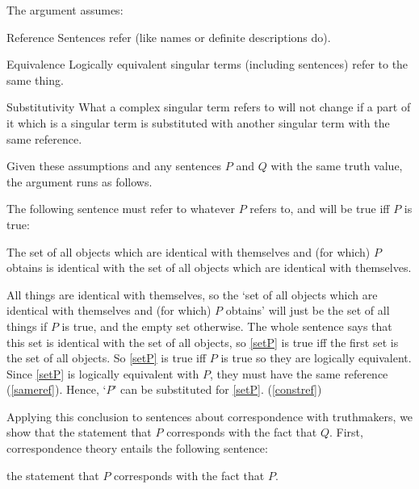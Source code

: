 The argument assumes:
\parencite[753]{Davidson_1969}

	\begin{principle}{Reference}\label{srefer}
	Sentences refer (like names or definite descriptions do).
	\end{principle}

	\begin{principle}{Equivalence}\label{sameref}
	Logically equivalent singular terms (including sentences) refer to the same thing.
	\end{principle}

	\begin{principle}{Substitutivity}\label{constref}
	What a complex singular term refers to will not change if a part of it which is a singular term is substituted with another singular term with the same reference.
	\end{principle}


Given these assumptions and any sentences $P$ and $Q$ with the same truth value, the argument runs as follows.

The following sentence must refer to whatever $P$ refers to, and will be true iff $P$ is true:

	\begin{example}\label{setP}
	The set of all objects which are identical with themselves and (for which) $P$ obtains is identical with the set of all objects which are identical with themselves.
	\end{example}

All things are identical with themselves, so the `set of all objects which are identical with themselves and (for which) $P$ obtains' will just be the set of all things if $P$ is true, and the empty set otherwise.
The whole sentence says that this set is identical with the set of all objects, so \ref{setP} is true iff the first set is the set of all objects.
So \ref{setP} is true iff $P$ is true so they are logically equivalent.
Since \ref{setP} is logically equivalent with $P$, they must have the same reference (\ref{sameref}).
Hence, `$P$' can be substituted for \ref{setP}.
(\ref{constref})

Applying this conclusion to sentences about correspondence with truthmakers, we show that the statement that $P$ corresponds with the fact that $Q$.
First, correspondence theory entails the following sentence:

	\begin{example}\label{stateP}
	the statement that $P$ corresponds with the fact that $P$.
	\end{example}

